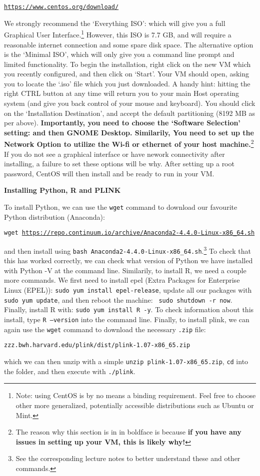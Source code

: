 \documentclass[10pt]{article}
\begin{document}
\begin{center}
\href{https://www.centos.org/download/}{\texttt{https://www.centos.org/download/}}
\end{center}

We strongly recommend the `Everything ISO': which will give you a full Graphical User Interface.\footnote{Note: using CentOS is by no means a binding requirement. Feel free to choose other more generalized, potentially accessible distributions such as Ubuntu or Mint.} However, this ISO is 7.7 GB, and will require a reasonable internet connection and some spare disk space. The alternative option is the `Minimal ISO', which will only give you a command line prompt and limited functionality. To begin the installation, right click on the new VM which you recently configured, and then click on `Start'. Your VM should open, asking you to locate the `.iso' file which you just downloaded. A handy hint: hitting the right CTRL button at any time will return you to your main Host operating system (and give you back control of your mouse and keyboard). You should click on the `Installation Destination', and accept the default partitioning (8192 MB as per above). \textbf{Importantly, you need to choose the `Software Selection' setting: and then GNOME Desktop. Similarily, You need to set up the Network Option to utilize the Wi-fi or ethernet of your host machine.}\footnote{The reason why this section is in in boldface is because \textbf{if you have any issues in setting up your VM, this is likely why!}} If you do not see a graphical interface or have nework connectivity after installing, a failure to set these options will be why. After setting up a root password, CentOS will then install and be ready to run in your VM.\vspace{0.2in}

\textbf{Installing Python, R and PLINK}

To install Python, we can use the \texttt{wget} command to download our favourite Python distribution (Anaconda):
\begin{center}
\texttt{wget \href{https://repo.continuum.io/archive/Anaconda2-4.4.0-Linux-x86\_64.sh}{https://repo.continuum.io/archive/Anaconda2-4.4.0-Linux-x86\_64.sh}}
\end{center}
and then install using \texttt{bash Anaconda2-4.4.0-Linux-x86\_64.sh}.\footnote{See the corresponding lecture notes to better understand these and other commands.} To check that this has worked correctly, we can check what version of Python we have installed with Python -V at the command line. Similarily, to install R, we need a couple more commands. We first need to install epel (Extra Packages for Enterprise Linux (EPEL)): \texttt{sudo yum install epel-release}, update all our packages with \texttt{sudo yum update}, and then reboot the machine: \texttt{ sudo shutdown -r now}. Finally, install R with:  \texttt{sudo yum install R -y}. To check information about this install, type \texttt{R --version} into the command line.  Finally, to install plink, we can again use the \texttt{wget} command to download the necessary \texttt{.zip} file:

\begin{center}
\texttt{zzz.bwh.harvard.edu/plink/dist/plink-1.07-x86\_65.zip}
\end{center}

which we can then unzip with a simple \texttt{unzip plink-1.07-x86\_65.zip}, \texttt{cd} into the folder, and then execute with \texttt{./plink}.
\end{document}
